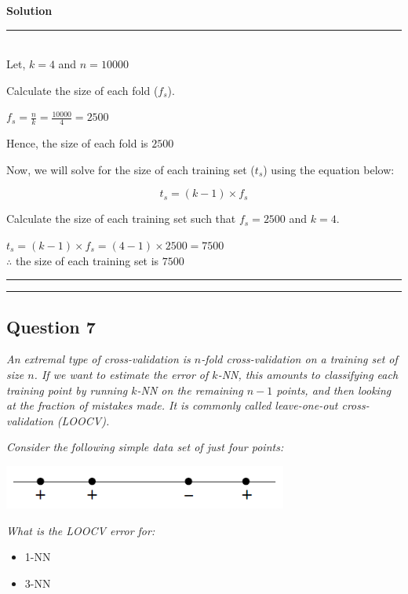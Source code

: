 \documentclass{article}
\begin{document}
\textbf{Solution} 

\noindent\rule{\textwidth}{0.4pt}\\

Let, $k=4$ and $n=10000$

Calculate the size of each fold ($f_s$).

$f_s = \frac{n}{k} = \frac{10000}{4} = 2500$

Hence, the size of each fold is $2500$

Now, we will solve for the size of each training set ($t_s$) using the equation below:

$$t_s = (k-1)\times f_s$$

Calculate the size of each training set such that $f_s=2500$ and $k=4$.

$t_s = (k-1)\times f_s = (4-1) \times 2500 = 7500$\\

$\therefore$ the size of each training set is $7500$

\noindent\rule{\textwidth}{0.4pt}

\noindent\rule{\textwidth}{0.4pt}

\subsection*{Question 7}

\textit{An extremal type of cross-validation is $n$-fold cross-validation on a training set of size $n$. If we want to estimate the error of $k$-NN, this amounts to classifying each training point by running $k$-NN on the remaining $n-1$ points, and then looking at the fraction of mistakes made. It is commonly called leave-one-out cross-validation (LOOCV).}

\textit{Consider the following simple data set of just four points:}

\begin{center}
\includegraphics[width=0.7\textwidth]{dsc_255_hw1_7.png}
\end{center}

\textit{What is the LOOCV error for:}
\begin{itemize}
    \item 1-NN
    \item 3-NN
\end{itemize}
\end{document}
